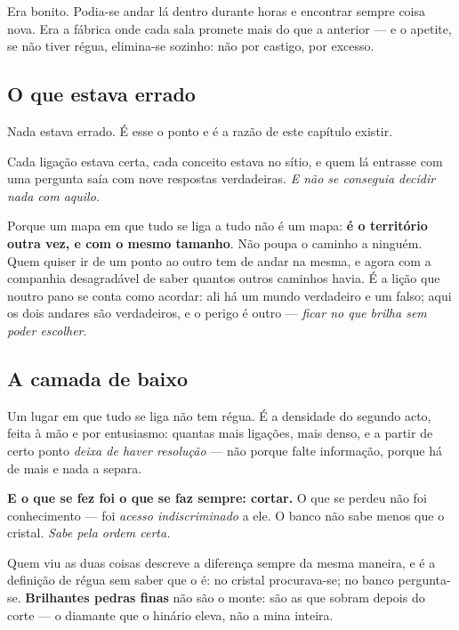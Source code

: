 \documentclass[livro.tex]{subfiles}
\begin{document}
Era bonito. Podia-se andar lá dentro durante horas e encontrar sempre coisa nova. Era a fábrica
onde cada sala promete mais do que a anterior --- e o apetite, se não tiver régua, elimina-se
sozinho: não por castigo, por excesso.

\subsection*{O que estava errado}

Nada estava errado. É esse o ponto e é a razão de este capítulo existir.

\medskip

Cada ligação estava certa, cada conceito estava no sítio, e quem lá entrasse com uma pergunta saía
com nove respostas verdadeiras. \emph{E não se conseguia decidir nada com aquilo.}

\medskip

Porque um mapa em que tudo se liga a tudo não é um mapa: \textbf{é o território outra vez, e com o
mesmo tamanho}. Não poupa o caminho a ninguém. Quem quiser ir de um ponto ao outro tem de andar
na mesma, e agora com a companhia desagradável de saber quantos outros caminhos havia. É a
lição que noutro pano se conta como acordar: ali há um mundo verdadeiro e um falso; aqui os
dois andares são verdadeiros, e o perigo é outro --- \emph{ficar no que brilha sem poder
escolher}.

\subsection*{A camada de baixo}

Um lugar em que tudo se liga não tem régua. É a densidade do segundo acto, feita à mão e por
entusiasmo: quantas mais ligações, mais denso, e a partir de certo ponto \emph{deixa de haver
resolução} --- não porque falte informação, porque há de mais e nada a separa.

\medskip

\textbf{E o que se fez foi o que se faz sempre: cortar.} O que se perdeu não foi conhecimento ---
foi \emph{acesso indiscriminado} a ele. O banco não sabe menos que o cristal. \emph{Sabe pela
ordem certa.}

\medskip

Quem viu as duas coisas descreve a diferença sempre da mesma maneira, e é a definição de régua sem
saber que o é: no cristal procurava-se; no banco pergunta-se. \textbf{Brilhantes pedras finas}
não são o monte: são as que sobram depois do corte --- o diamante que o hinário eleva, não a
mina inteira.
\end{document}
